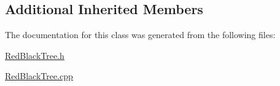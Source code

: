 \subsection*{Additional Inherited Members}


The documentation for this class was generated from the following files\+:\begin{DoxyCompactItemize}
\item 
\hyperlink{_red_black_tree_8h}{Red\+Black\+Tree.\+h}\item 
\hyperlink{_red_black_tree_8cpp}{Red\+Black\+Tree.\+cpp}\end{DoxyCompactItemize}
